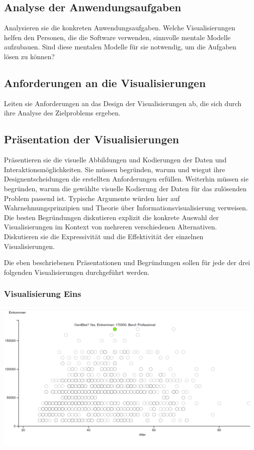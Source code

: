 \documentclass[usegeometry=true]{scrartcl}
\begin{document}
\subsection{Analyse der Anwendungsaufgaben}
Analysieren sie die konkreten Anwendungsaufgaben. Welche Visualisierungen helfen den Personen, die die Software verwenden, sinnvolle mentale Modelle aufzubauen. Sind diese mentalen Modelle für sie notwendig, um die Aufgaben lösen zu können?
\subsection{Anforderungen an die Visualisierungen}
Leiten sie Anforderungen an das Design der Visualisierungen ab, die sich durch ihre Analyse des Zielproblems ergeben.
\subsection{Präsentation der Visualisierungen}
Präsentieren sie die visuelle Abbildungen und Kodierungen der Daten und Interaktionsmöglichkeiten. 
Sie müssen  begründen, warum und wiegut ihre Designentscheidungen die erstellten Anforderungen erfüllen. 
Weiterhin müssen sie begründen, warum die gewählte visuelle Kodierung der Daten für das zulösenden Problem passend ist. 
Typische Argumente würden hier auf Wahrnehmungsprinzipien und Theorie über Informationsvisualisierung verweisen. 
Die besten Begründungen diskutieren explizit die konkrete Auswahl der Visualisierungen im Kontext von mehreren verschiedenen Alternativen. Diskutieren sie die Expressivität und die Effektivität der einzelnen Visualisierungen. 

Die eben beschriebenen Präsentationen und Begründungen sollen für jede der drei folgenden Visualisierungen durchgeführt werden. 
\subsubsection{Visualisierung Eins}



\includegraphics{Scatterplot1}
\end{document}
